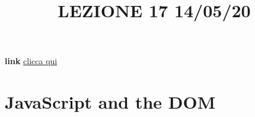 \title{LEZIONE 17 14/05/20}
\textbf{link} \href{https://web.microsoftstream.com/video/57f59578-62d3-46db-8a0c-63b47c342cf3?list=user&userId=cfe0965d-9a7c-40e2-be6e-f078296a1914}{clicca qui}
\section{JavaScript and the DOM}
